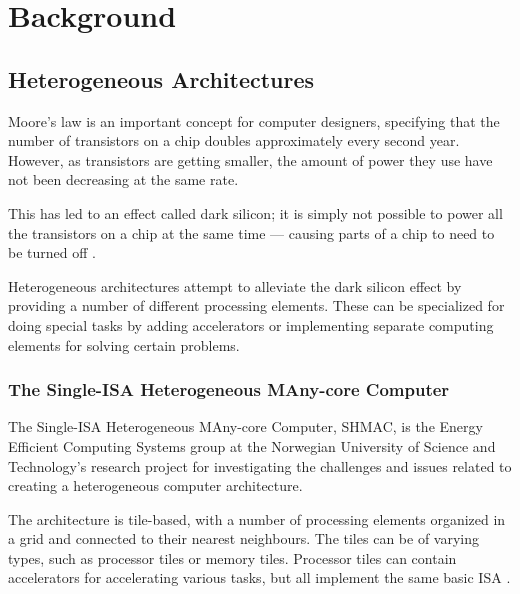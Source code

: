 \chapter{Background}

\section{Heterogeneous Architectures}
\label{sec:heterogeneous}

Moore's law is an important concept for computer designers, specifying that the
number of transistors on a chip doubles approximately every second year. However,
as transistors are getting smaller, the amount of power they use have not been
decreasing at the same rate.

This has led to an effect called dark silicon; it is simply not possible to
power all the transistors on a chip at the same time --- causing parts of
a chip to need to be turned off \cite{dark-silicon}.

Heterogeneous architectures attempt to alleviate the dark silicon effect by
providing a number of different processing elements. These can be specialized for
doing special tasks by adding accelerators or implementing separate computing
elements for solving certain problems.

\subsection{The Single-ISA Heterogeneous MAny-core Computer}
\label{sec:shmac}
The Single-ISA Heterogeneous MAny-core Computer, SHMAC, is the Energy Efficient Computing Systems group
at the Norwegian University of Science and Technology's research project for investigating the
challenges and issues related to creating a heterogeneous computer architecture.

The architecture is tile-based, with a number of processing elements organized
in a grid and connected to their nearest neighbours. The tiles can be of varying
types, such as processor tiles or memory tiles. Processor tiles can contain
accelerators for accelerating various tasks, but all implement the same basic
ISA \cite{shmac-plan}.

%
%

